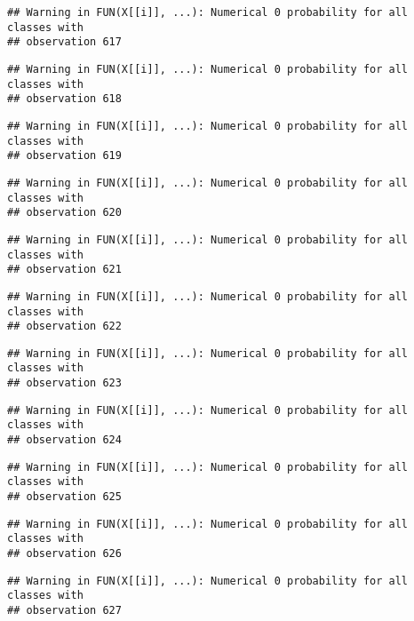 \documentclass[
]{article}
\begin{document}
\begin{verbatim}
## Warning in FUN(X[[i]], ...): Numerical 0 probability for all classes with
## observation 617
\end{verbatim}

\begin{verbatim}
## Warning in FUN(X[[i]], ...): Numerical 0 probability for all classes with
## observation 618
\end{verbatim}

\begin{verbatim}
## Warning in FUN(X[[i]], ...): Numerical 0 probability for all classes with
## observation 619
\end{verbatim}

\begin{verbatim}
## Warning in FUN(X[[i]], ...): Numerical 0 probability for all classes with
## observation 620
\end{verbatim}

\begin{verbatim}
## Warning in FUN(X[[i]], ...): Numerical 0 probability for all classes with
## observation 621
\end{verbatim}

\begin{verbatim}
## Warning in FUN(X[[i]], ...): Numerical 0 probability for all classes with
## observation 622
\end{verbatim}

\begin{verbatim}
## Warning in FUN(X[[i]], ...): Numerical 0 probability for all classes with
## observation 623
\end{verbatim}

\begin{verbatim}
## Warning in FUN(X[[i]], ...): Numerical 0 probability for all classes with
## observation 624
\end{verbatim}

\begin{verbatim}
## Warning in FUN(X[[i]], ...): Numerical 0 probability for all classes with
## observation 625
\end{verbatim}

\begin{verbatim}
## Warning in FUN(X[[i]], ...): Numerical 0 probability for all classes with
## observation 626
\end{verbatim}

\begin{verbatim}
## Warning in FUN(X[[i]], ...): Numerical 0 probability for all classes with
## observation 627
\end{verbatim}
\end{document}
